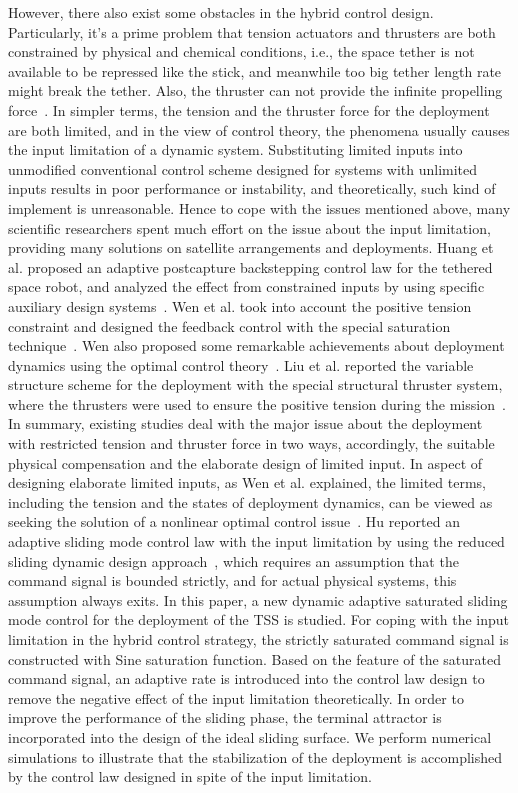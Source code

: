 \documentclass[3p]{elsarticle}
\theoremstyle{plain}
\theoremstyle{remark}
\begin{document}
However, there also exist some obstacles in the hybrid control design. Particularly, it's a prime problem that tension actuators and thrusters are both constrained by physical and chemical conditions, i.e., the space tether is not available to be repressed like the stick, and meanwhile too big tether length rate might break the tether. Also, the thruster can not provide the infinite propelling force~\cite{martinez1998spacecraft}. In simpler terms, the tension and the thruster force for the deployment are both limited, and in the view of control theory, the phenomena usually causes the input limitation of a dynamic system. Substituting limited inputs into unmodified conventional control scheme designed for systems with unlimited inputs results in poor performance or instability, and theoretically, such kind of implement is unreasonable. Hence to cope with the issues mentioned above, many scientific researchers spent much effort on the issue about the input limitation, providing many solutions on satellite arrangements and deployments. Huang et al. proposed an adaptive postcapture backstepping control law for the tethered space robot, and analyzed the effect from constrained inputs by using specific auxiliary design systems~\cite{huang2015adaptive}. Wen et al. took into account the positive tension constraint and designed the feedback control with the special saturation technique~\cite{wen2016constrained}. Wen also proposed some remarkable achievements about deployment dynamics using the optimal control theory~\cite{wen2008optimal}. Liu et al. reported the variable structure scheme for the deployment with the special structural thruster system, where the thrusters were used to ensure the positive tension during the mission~\cite{yingying2012variable}. In summary, existing studies deal with the major issue about the deployment with restricted tension and thruster force in two ways, accordingly, the suitable physical compensation and the elaborate design of limited input. In aspect of designing elaborate limited inputs, as Wen et al. explained, the limited terms, including the tension and the states of deployment dynamics, can be viewed as seeking the solution of a nonlinear optimal control issue~\cite{wen2015tension}. Hu reported an adaptive sliding mode control law with the input limitation by using the reduced sliding dynamic design approach~\cite{Hu2009Robust}, which requires an assumption that the command signal is bounded strictly, and for actual physical systems, this assumption always exits. In this paper, a new dynamic adaptive saturated sliding mode  control for the deployment of the TSS is studied. For coping with the input limitation in the hybrid control strategy, the strictly saturated command signal is constructed with Sine saturation function. Based on the feature of the saturated command signal, an adaptive rate is introduced into the control law design to remove the negative effect of the input limitation theoretically. In order to improve the performance of the sliding phase, the terminal attractor is incorporated into the design of the ideal sliding surface. We perform numerical simulations to illustrate that the stabilization of the deployment is accomplished by the control law designed in spite of the input limitation.\par
\end{document}
